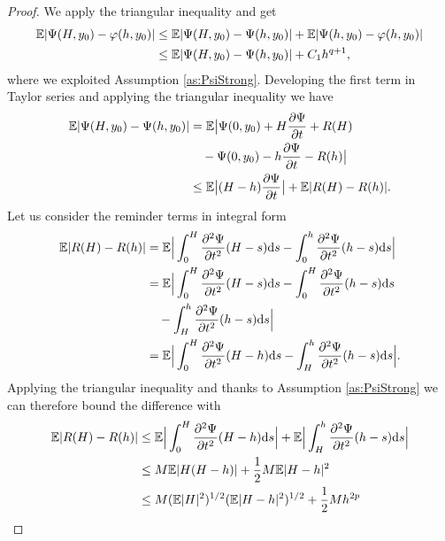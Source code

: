 \documentclass{scrartcl}
\begin{document}
\begin{proof} We apply the triangular inequality and get
	\begin{equation}\label{eq:firstStepStrong}
	\begin{aligned}
	\mathbb{E}\abs{\Psi(H, y_0) - \varphi(h, y_0)} &\leq \mathbb{E}\abs{\Psi(H, y_0) - \Psi(h, y_0)} + \mathbb{E}\abs{\Psi(h, y_0) - \varphi(h, y_0)} \\
	&\leq \mathbb{E}\abs{\Psi(H, y_0) - \Psi(h, y_0)} + C_1h^{q+1},
	\end{aligned}
	\end{equation}
	where we exploited Assumption \ref{as:PsiStrong}. Developing the first term in Taylor series and applying the triangular inequality we have
	\begin{equation}
	\begin{aligned}
	\mathbb{E}\abs{\Psi(H, y_0) - \Psi(h, y_0)} &= \mathbb{E}\big|\Psi(0, y_0) + H\pdv{\Psi}{t} (0, y_0) + R(H) \\
	&\quad - \Psi(0, y_0) - h\pdv{\Psi}{t} (0, y_0) - R(h) \big| \\
	&\leq \mathbb{E}\big|(H - h)\pdv{\Psi}{t} (0, y_0)\big| + \mathbb{E}|R(H) - R(h)|.
	\end{aligned}
	\end{equation}
	Let us consider the reminder terms in integral form
	\begin{equation}
	\begin{aligned}
	\mathbb{E}|R(H) - R(h)| &= \mathbb{E}\Big| \int_{0}^{H}\pdv[2]{\Psi}{t} (s, y_0)(H-s)\dd s - \int_{0}^{h}\pdv[2]{\Psi}{t} (s, y_0)(h-s)\dd s \Big|\\
	&= \mathbb{E}\Big| \int_{0}^{H}\pdv[2]{\Psi}{t} (s, y_0)(H-s)\dd s - \int_{0}^{H}\pdv[2]{\Psi}{t} (s, y_0)(h-s)\dd s \\
	&\quad - \int_{H}^{h}\pdv[2]{\Psi}{t} (s, y_0)(h-s)\dd s \Big|\\
	&= \mathbb{E}\Big| \int_{0}^{H}\pdv[2]{\Psi}{t} (s, y_0)(H-h)\dd s - \int_{H}^{h}\pdv[2]{\Psi}{t} (s, y_0)(h-s)\dd s\Big|.
	\end{aligned}
	\end{equation}
	Applying the triangular inequality and thanks to Assumption \ref{as:PsiStrong} we can therefore bound the difference with
	\begin{equation}
	\begin{aligned}
	\E|R(H) - R(h)| &\leq \E\Big|\int_{0}^{H}\pdv[2]{\Psi}{t} (s, y_0)(H-h)\dd s \Big| + \E\Big|  \int_{H}^{h}\pdv[2]{\Psi}{t} (s, y_0)(h-s)\dd s \Big| \\
	&\leq M \E|H(H-h)| + \frac{1}{2}M\E|H-h|^2 \\
	&\leq M (\E|H|^2)^{1/2}(\E|H-h|^2)^{1/2} + \frac{1}{2}Mh^{2p}\\

\end{aligned}
\end{equation}
\end{proof}
\end{document}
